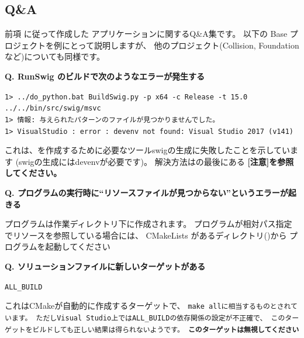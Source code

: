 \subsection{Q\&A}
\label{subsec:QandA}
\parindent=0pt

前項 に従って作成した
アプリケーションに関するQ\&A集です。
以下\SprLib の Base プロジェクトを例にとって説明しますが、
他のプロジェクト(Collision, Foundationなど)についても同様です。

\bigskip

\thinrule{\linewidth}

\bf{Q. RunSwig のビルドで次のようなエラーが発生する}

\begin{narrow}[f][15pt]
\tt{1> ../do\_python.bat BuildSwig.py -p x64 -c Release -t 15.0 ../../bin/src/swig/msvc}\\
\tt{1> 情報: 与えられたパターンのファイルが見つかりませんでした。}\\
\tt{1> VisualStudio : error : devenv not found: Visual Studio 2017 (v141)}
\end{narrow}

\medskip
これは、\SprLib を作成するために必要なツールswigの生成に失敗したことを示しています
(swigの生成にはdevenvが必要です)。
解決方法はの最後にある
\bf{[注意]}を参照してください。

\thinrule{\linewidth}

\bf{Q. プログラムの実行時に“リソースファイルが見つからない”というエラーが起きる}

\medskip
プログラムは作業ディレクトリ\BldDir 下に作成されます。
プログラムが相対パス指定でリソースを参照している場合には、
CMakeLists{} があるディレクトリ()から
プログラムを起動してください

\thinrule{\linewidth}

\bf{Q. ソリューションファイルに新しいターゲットがある}

\tt{ALL\_BUILD}
\begin{narrow}
	これはCMakeが自動的に作成するターゲットで、
	\tt{make all}に相当するものとされています。
	ただしVisual Studio上では\tt{ALL\_BUILD}の依存関係の設定が不正確で、
	このターゲットをビルドしても正しい結果は得られないようです。
	\bf{このターゲットは無視してください}
\end{narrow}

